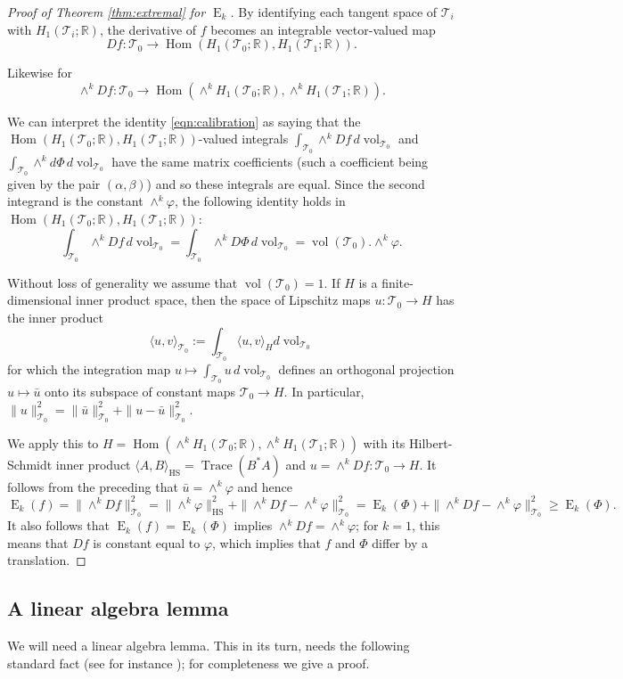 \documentclass[11pt,letterpaper]{amsart}
\theoremstyle{definition}
\numberwithin{equation}{section}
\theoremstyle{definition}
\newcommand{\Tc}{\mathcal{T}}
\newcommand{\Rb}{\mathbb{R}}
\DeclareMathOperator{\En}{E}
\DeclareMathOperator{\HS}{HS}
\DeclareMathOperator{\Hom}{Hom}
\DeclareMathOperator{\tr}{Trace}
\newcommand{\vol}{\operatorname{vol}}
\begin{document}
\begin{proof}[Proof of Theorem \ref{thm:extremal} for $\En_k$] 
By identifying each tangent space of $\Tc_i$ with  $H_1(\Tc_i;\Rb)$, the derivative of $f$ becomes an integrable vector-valued  map  
\[Df: \Tc_0\to \Hom (H_1(\Tc_0;\Rb), H_1(\Tc_1;\Rb)).\]  

Likewise for 
\[\wedge^k Df: \Tc_0\to \Hom (\wedge^kH_1(\Tc_0;\Rb), \wedge^kH_1(\Tc_1;\Rb)).\] 

We can interpret the identity \eqref{eqn:calibration} as saying that the $\Hom (H_1(\Tc_0;\Rb), H_1(\Tc_1;\Rb))$-valued integrals
$\int_{\Tc_0} \wedge^k Df\,d\!\vol_{\Tc_0}$ and $\int_{\Tc_0} \wedge^k d\Phi\,d\!\vol_{\Tc_0}$
have  the same  matrix coefficients (such a coefficient being given by the pair $(\alpha, \beta)$) and so these integrals are equal. Since the second integrand is the constant $\wedge^k\varphi$, the following 
identity holds in $\Hom (H_1(\Tc_0;\Rb), H_1(\Tc_1;\Rb))$:
\begin{equation}\label{eqn:average}
\textstyle \int_{\Tc_0} \wedge^k Df\,d\!\vol_{\Tc_0}=\int_{\Tc_0} \wedge^k D\Phi\,d\!\vol_{\Tc_0}=\vol(\Tc_0).\wedge^k\varphi .
\end{equation}

Without loss of generality we assume that $\vol(\Tc_0)=1$. If $H$ is a finite-dimensional inner product space, then the space  of  Lipschitz maps  $u: \Tc_0\to H$ has the inner product  
\[\langle u , v\rangle_{\Tc_0}:=\int_{\Tc_0}\langle u , v\rangle_Hd\!\vol_{\Tc_0}\]  
for which the integration map $u\mapsto \int_{\Tc_0} u\, d\!\vol_{\Tc_0}$ defines  an orthogonal  projection $u\mapsto \bar u$ onto its subspace of constant maps $ \Tc_0\to H$. In particular, $\| u\|^2_{\Tc_0}=\|  \bar u\|^2_{\Tc_0}+\|  u-\bar u\|^2_{\Tc_0}$.

We apply this to $H=\Hom (\wedge^kH_1(\Tc_0; \Rb), \wedge^kH_1(\Tc_1; \Rb))$ with its Hilbert-Schmidt inner product
$\langle  A, B\rangle_{\HS}=\tr (B^*A)$ and  $u=\wedge^k Df: \Tc_0\to H$.   
It follows from the preceding that $\bar u=\wedge^k \varphi$ and hence 
\[
\En_k(f)=\|\wedge^k Df\|^2_{\Tc_0}= \|\wedge^k \varphi\|^2_{\HS}+\|\wedge^k Df-\wedge^k \varphi \|^2_{\Tc_0}=\En_k(\Phi)+\|\wedge^k Df-\wedge^k \varphi \|^2_{\Tc_0}\ge \En_k(\Phi).
\]
It also follows that $\En_k(f)=\En_k(\Phi)$ implies $\wedge^k Df=\wedge^k \varphi $; for $k=1$, this means that $Df$  is constant equal to $\varphi$, which implies  that $f$ and $\Phi$ differ by a translation.
\end{proof}


\subsection{A linear algebra lemma}
We will need a linear algebra lemma. This in its turn, needs the following standard  fact (see for instance 
\cite[Ch.\ 1]{MOA11}); for completeness we give a proof.
\end{document}
